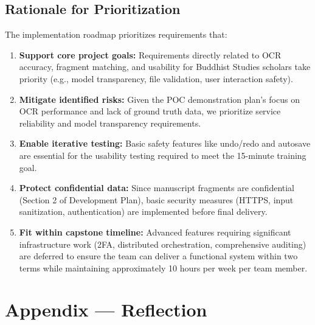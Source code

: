 \documentclass{article}
\begin{document}
\subsection{Rationale for Prioritization}

The implementation roadmap prioritizes requirements that:

\begin{enumerate}
    \item \textbf{Support core project goals:} Requirements directly related to OCR accuracy, fragment matching, and usability for Buddhist Studies scholars take priority (e.g., model transparency, file validation, user interaction safety).

    \item \textbf{Mitigate identified risks:} Given the POC demonstration plan's focus on OCR performance and lack of ground truth data, we prioritize service reliability and model transparency requirements.

    \item \textbf{Enable iterative testing:} Basic safety features like undo/redo and autosave are essential for the usability testing required to meet the 15-minute training goal.

    \item \textbf{Protect confidential data:} Since manuscript fragments are confidential (Section 2 of Development Plan), basic security measures (HTTPS, input sanitization, authentication) are implemented before final delivery.

    \item \textbf{Fit within capstone timeline:} Advanced features requiring significant infrastructure work (2FA, distributed orchestration, comprehensive auditing) are deferred to ensure the team can deliver a functional system within two terms while maintaining approximately 10 hours per week per team member.
\end{enumerate}

\newpage{}







\newpage{}

\section*{Appendix --- Reflection}
\end{document}
